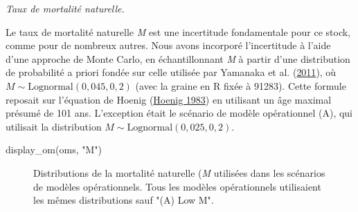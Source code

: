\documentclass[french,11pt]{book}
\newenvironment{Shaded}{\begin{snugshade}}{\end{snugshade}}
\newcommand{\CommentTok}[1]{\textcolor[rgb]{0.56,0.35,0.01}{\textbf{#1}}}
\newcommand{\DecValTok}[1]{\textcolor[rgb]{0.00,0.00,0.81}{#1}}
\newcommand{\FloatTok}[1]{\textcolor[rgb]{0.00,0.00,0.81}{#1}}
\newcommand{\FunctionTok}[1]{\textcolor[rgb]{0.00,0.00,0.00}{#1}}
\newcommand{\NormalTok}[1]{#1}
\newcommand{\OtherTok}[1]{\textcolor[rgb]{0.56,0.35,0.01}{#1}}
\newcommand{\SpecialCharTok}[1]{\textcolor[rgb]{0.00,0.00,0.00}{#1}}
\newcommand{\StringTok}[1]{\textcolor[rgb]{0.31,0.60,0.02}{#1}}
\begin{document}
\emph{Taux de mortalité naturelle.}

Le taux de mortalité naturelle \emph{M} est une incertitude fondamentale pour ce stock, comme pour de nombreux autres. Nous avons incorporé l'incertitude à l'aide d'une approche de Monte Carlo, en échantillonnant \emph{M} à partir d'une distribution de probabilité a priori fondée sur celle utilisée par Yamanaka et al. (\protect\hyperlink{ref-yamanaka2011}{2011}), où \(M \sim \textrm{Lognormal}(0,045, 0,2)\) (avec la graine en R fixée à 91283). Cette formule reposait sur l'équation de Hoenig (\protect\hyperlink{ref-hoenig1983}{Hoenig 1983}) en utilisant un âge maximal présumé de 101 ans. L'exception était le scénario de modèle opérationnel (A), qui utilisait la distribution \(M \sim \textrm{Lognormal}(0,025, 0,2)\).
\begin{Shaded}
\end{Shaded}
\begin{Shaded}
\begin{Highlighting}[]
\FunctionTok{display\_om}\NormalTok{(oms, }\StringTok{"M"}\NormalTok{)}
\end{Highlighting}
\end{Shaded}
\begin{figure}[htb]

{\centering {} 

}

\caption{Distributions de la mortalité naturelle (\emph{M} utilisées dans les scénarios de modèles opérationnels. Tous les modèles opérationnels utilisaient les mêmes distributions sauf "(A) Low M".}\label{fig:desc-stock-m-yelloweye}
\end{figure}
\end{document}
